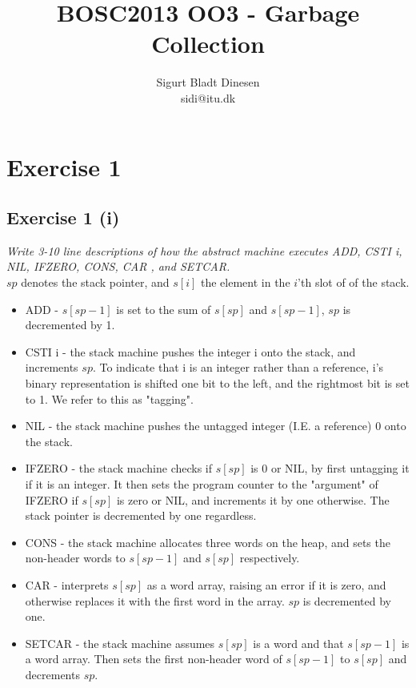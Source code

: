 \documentclass[a4paper, titlepage]{article}
\begin{document}
\title{BOSC2013 OO3 - Garbage Collection}
\author{Sigurt Bladt Dinesen \\sidi{@}itu.dk}
\maketitle
\tableofcontents{}
\pagebreak

\section{Exercise 1}
\subsection{Exercise 1 (i)}
\textit{Write 3-10 line descriptions of how the abstract machine executes ADD,
CSTI i, NIL, IFZERO, CONS, CAR , and SETCAR.}\\

$sp$ denotes the stack pointer, and $s[i]$ the element in the $i$'th slot of of the stack.
\begin{itemize}
	\item ADD - $s[sp-1]$ is set to the sum of $s[sp]$ and $s[sp-1]$, $sp$
		is decremented by 1.
	\item CSTI i - the stack machine pushes the integer i onto the stack,
		and increments $sp$. To indicate that i is an integer rather
		than a reference, i's binary representation is shifted one bit
		to the left, and the rightmost bit is set to 1. We refer to this
		as "tagging".
	\item NIL - the stack machine pushes the untagged integer (I.E. a
		reference) 0 onto the stack.
	\item IFZERO - the stack machine checks if $s[sp]$ is 0 or NIL, by
		first untagging it if it is an integer. It then sets the program
		counter to the "argument" of IFZERO if $s[sp]$ is zero or NIL,
		and increments it by one otherwise. The stack pointer is
		decremented by one regardless.
	\item CONS - the stack machine allocates three words on the heap, and
		sets the non-header words to $s[sp-1]$ and $s[sp]$ respectively.
	\item CAR - interprets $s[sp]$ as a word array, raising an error if it
		is zero, and otherwise replaces it with the first word in the
		array. $sp$ is decremented by one.
	\item SETCAR - the stack machine assumes $s[sp]$ is a word and that
		$s[sp-1]$ is a word array. Then sets the first non-header word
		of $s[sp-1]$ to $s[sp]$ and decrements $sp$.
\end{itemize}
\end{document}

